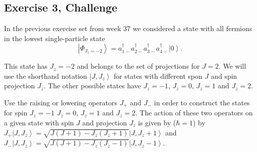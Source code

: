 \documentclass[prc]{revtex4}
\newcommand{\ket}[1]{\left| #1 \right\rangle}
\begin{document}
\subsection*{Exercise 3, Challenge}

In the previous exercise set from week 37 we considered a state with all fermions in the lowest
single-particle state
\[
\ket{\Phi_{J_z=-2}} =a_{1-}^{\dagger}a_{2-}^{\dagger}
a_{3-}^{\dagger}a_{4-}^{\dagger}\ket{0}.
\]

This state has $J_{z}=-2$ and belongs to the set of projections for
$J=2$.  We will use the shorthand notation $\ket{J,J_z}$ for states
with different spon $J$ and spin projection $J_z$.  The other possible
states have $J_{z}=-1$, $J_{z}=0$, $J_{z}=1$ and $J_{z}=2$.

Use the raising or lowering operators $J_{+}$ and $J_{-}$  in order to construct the 
states for spin $J_{z}=-1$ $J_{z}=0$, $J_{z}=1$
and $J_{z}=2$.
The action of these two operators on a given state with spin $J$ and projection $J_z$
is given by ($\hbar = 1$) by
$J_+\ket{J,J_z}=\sqrt{J(J+1)-J_z(J_z+1)}\ket{J,J_z+1}$ and
$J_-\ket{J,J_z}=\sqrt{J(J+1)-J_z(J_z-1)}\ket{J,J_z-1}$.
\end{document}
